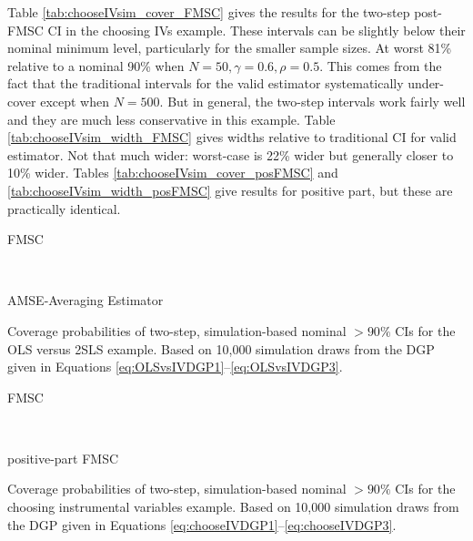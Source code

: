 Table \ref{tab:chooseIVsim_cover_FMSC} gives the results for the two-step post-FMSC CI in the choosing IVs example.
These intervals can be slightly below their nominal minimum level, particularly for the smaller sample sizes.
At worst 81\% relative to a nominal 90\% when $N=50, \gamma = 0.6, \rho = 0.5$. 
This comes from the fact that the traditional intervals for the valid estimator systematically under-cover except when $N = 500$.
But in general, the two-step intervals work fairly well and they are much less conservative in this example.
Table \ref{tab:chooseIVsim_width_FMSC} gives widths relative to traditional CI for valid estimator.
Not that much wider: worst-case is 22\% wider but generally closer to 10\% wider.
Tables \ref{tab:chooseIVsim_cover_posFMSC} and \ref{tab:chooseIVsim_width_posFMSC} give results for positive part, but these are practically identical.

\begin{table}[h]
\footnotesize
\centering
	\begin{subtable}{0.48\textwidth}
		\caption{FMSC}
		
		\label{tab:OLSvsIVsim_cover_FMSC}
	\end{subtable}	
	~
	\begin{subtable}{0.48\textwidth}
		\caption{AMSE-Averaging Estimator}
		
		\label{tab:OLSvsIVsim_cover_AVG}
	\end{subtable}
	\caption{Coverage probabilities of two-step, simulation-based nominal $>90\%$ CIs for the OLS versus 2SLS example. Based on 10,000 simulation draws from the DGP given in Equations \ref{eq:OLSvsIVDGP1}--\ref{eq:OLSvsIVDGP3}.}
\end{table}





\begin{table}[h]
\footnotesize
\centering
	\begin{subtable}{0.48\textwidth}
		\caption{FMSC}
		\label{tab:chooseIVsim_cover_FMSC}
		
	\end{subtable}	
	~
	\begin{subtable}{0.48\textwidth}
		\caption{positive-part FMSC}
		\label{tab:chooseIVsim_cover_posFMSC}
		
	\end{subtable}
	\caption{Coverage probabilities of two-step, simulation-based nominal $>90\%$ CIs for the choosing instrumental variables example. Based on 10,000 simulation draws from the DGP given in Equations \ref{eq:chooseIVDGP1}--\ref{eq:chooseIVDGP3}.}
\end{table}

